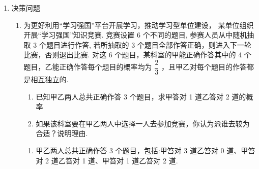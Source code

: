 \begin{enumerate}
\begin{enumerate}
\begin{jieda}
            \begin{center}
            
            \begin{tabular}{|c|c|c|c|c|c|c|}
            \hline
            ${\xi }_{1}$ & 0 & 1 & \phantom{X} & ${\xi }_{2}$ & 0 & 1 \\
            \cline{1-7}
            $P$ & ${p}_{1}$ & $1 - {p}_{1}$ & \phantom{X} & $P$ & ${p}_{2}$ & $1 - {p}_{2}$ \\
            \cline{1-7}
            \hline
            \end{tabular}
            
            \end{center}
            
            则 $E\left( {\xi }_{1}\right)  = 1 - {p}_{1},E\left( {\xi }_{2}\right)  = 1 - {p}_{2},D\left( {\xi }_{1}\right)  = {p}_{1}\left( {1 - {p}_{1}}\right) ,D\left( {\xi }_{2}\right)  = {p}_{2}\left( {1 - {p}_{2}}\right)$ ,
            
            由 $E\left( {\xi }_{1}\right)  < E\left( {\xi }_{2}\right)  \Rightarrow  1 - {p}_{1} < 1 - {p}_{2} \Rightarrow  {p}_{1} > {p}_{2}$ ,因为 $0 < {p}_{i} < \dfrac{1}{2},i = 1,2$ ,
            
            函数 $y = x\left( {1 - x}\right)$ 在 $\left( {0,\dfrac{1}{2}}\right)$ 上单调递增,所以 $D\left( {\xi }_{1}\right)  > D\left( {\xi }_{2}\right)$ .
        \end{jieda}
    \end{enumerate}

    \item 决策问题
    \begin{enumerate}
        \item 为更好利用“学习强国”平台开展学习，推动学习型单位建设， 某单位组织开展“学习强国”知识竞赛. 竞赛设置 6 个不同的题目, 参赛人员从中随机抽取 3 个题目进行作答, 若所抽取的 3 个题目全部作答正确，则进入下一轮比赛，否则退出比赛. 对这 6 个题目，某科室的甲能正确作答其中的 4 个题目，乙能正确作答每个题目的概率均为 $\dfrac{2}{3}$ ，且甲乙对每个题目的作答都是相互独立的.
        \begin{enumerate}
            \item 已知甲乙两人总共正确作答 3 个题目，求甲答对 1 道乙答对 2 道的概率
            \item 如果该科室要在甲乙两人中选择一人去参加竞赛，你认为派谁去较为合适？说明理由.
        \end{enumerate}
        \begin{jieda}
            \begin{enumerate}
                \item 甲乙两人总共正确作答 3 个题目，包括:甲笞对 3 道乙笞对 0 道、甲笞对 2 道乙笞对 1 道、甲笞对 1 道乙笞对 2 道.
                

\end{enumerate}
\end{jieda}
\end{enumerate}
\end{enumerate}
